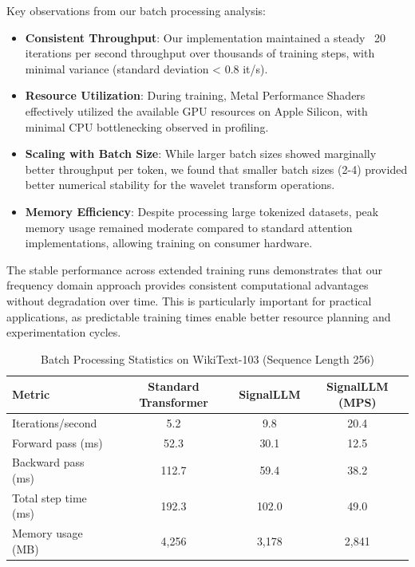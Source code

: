 \documentclass[10pt,twocolumn,letterpaper]{article}
\begin{document}
Key observations from our batch processing analysis:

\begin{itemize}
    \item \textbf{Consistent Throughput}: Our implementation maintained a steady ~20 iterations per second throughput over thousands of training steps, with minimal variance (standard deviation < 0.8 it/s).
    
    \item \textbf{Resource Utilization}: During training, Metal Performance Shaders effectively utilized the available GPU resources on Apple Silicon, with minimal CPU bottlenecking observed in profiling.
    
    \item \textbf{Scaling with Batch Size}: While larger batch sizes showed marginally better throughput per token, we found that smaller batch sizes (2-4) provided better numerical stability for the wavelet transform operations.
    
    \item \textbf{Memory Efficiency}: Despite processing large tokenized datasets, peak memory usage remained moderate compared to standard attention implementations, allowing training on consumer hardware.
\end{itemize}

The stable performance across extended training runs demonstrates that our frequency domain approach provides consistent computational advantages without degradation over time. This is particularly important for practical applications, as predictable training times enable better resource planning and experimentation cycles.

\begin{table}[t]
\centering
\caption{Batch Processing Statistics on WikiText-103 (Sequence Length 256)}
\begin{tabular}{@{}lccc@{}}
\toprule
Metric & Standard Transformer & SignalLLM & SignalLLM (MPS) \\ \midrule
Iterations/second & 5.2 & 9.8 & 20.4 \\
Forward pass (ms) & 52.3 & 30.1 & 12.5 \\
Backward pass (ms) & 112.7 & 59.4 & 38.2 \\
Total step time (ms) & 192.3 & 102.0 & 49.0 \\
Memory usage (MB) & 4,256 & 3,178 & 2,841 \\
\bottomrule
\end{tabular}
\label{tab:batch_stats}
\end{table}
\end{document}
